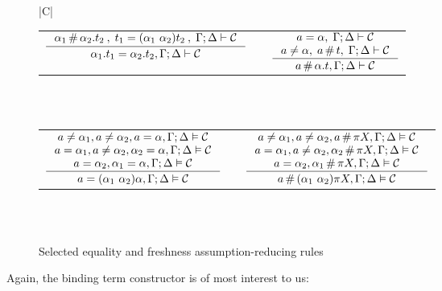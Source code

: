 \documentclass[english, mgr]{iithesis}
\newcommand{\solverRule}{\vdash}
\begin{document}
\begin{figure}[htpb]
  \centering
  \begin{tabularx}{\textwidth}{|C|}
  \hline \\
  \begin{tabular}{ccc} $
    \inference{
      \atomexp_1 \cfresh \tbind{\atomexp_2} \term_2\:,\;
        \term_1 = \permswap{\atomexp_1}{\atomexp_2}\term_2 \:, \;
        \cEnv ; \icEnv \solverRule \sconstr
    }{
      \tbind{\atomexp_1} \term_1 \ceq \tbind{\atomexp_2} \term_2 , \cEnv ; \icEnv \solverRule \sconstr
    } $ & & $
    \inference{
      \atomv \ceq \atomexp, \; \cEnv ; \icEnv \solverRule \sconstr
      \\
      \atomv \cneq \atomexp, \; \atomv \cfresh \term,\;\cEnv ; \icEnv \solverRule \sconstr
    }{
      \atomv \cfresh \tbind{\atomexp} \term , \cEnv ; \icEnv \solverRule \sconstr
    } $
  \end{tabular}
  \\ \\
  \begin{tabular}{ccc} $
    \inference{
      \atomv \cneq \atomexp_1, \atomv \cneq \atomexp_2, \atomv     \ceq \atomexp, \cEnv ; \icEnv \vDash \sconstr \\
      \atomv \ceq  \atomexp_1, \atomv \cneq \atomexp_2, \atomexp_2 \ceq \atomexp, \cEnv ; \icEnv \vDash \sconstr \\
                              \atomv \ceq  \atomexp_2, \atomexp_1 \ceq \atomexp, \cEnv ; \icEnv \vDash \sconstr
    }{
      \atomv \ceq \permswap{\atomexp_1}{\atomexp_2} \atomexp, \cEnv ; \icEnv \vDash \sconstr
    } $ & & $
    \inference{
      \atomv \cneq \atomexp_1, \atomv \cneq \atomexp_2, \atomv     \cfresh \perm\termv, \cEnv ; \icEnv \vDash \sconstr \\
      \atomv \ceq  \atomexp_1, \atomv \cneq \atomexp_2, \atomexp_2 \cfresh \perm\termv, \cEnv ; \icEnv \vDash \sconstr \\
                              \atomv \ceq  \atomexp_2, \atomexp_1 \cfresh \perm\termv, \cEnv ; \icEnv \vDash \sconstr
    }{
      \atomv \cfresh \permswap{\atomexp_1}{\atomexp_2} \perm\termv, \cEnv ; \icEnv \vDash \sconstr
    } $
  \end{tabular}
  \\ \\\hline
  \end{tabularx}
  \caption{Selected equality and freshness assumption-reducing rules}
  \label{fig:abstraction}
\end{figure}
Again, the binding term constructor is of most interest to us:
\end{document}
